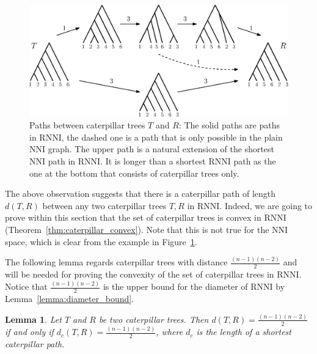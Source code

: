 \documentclass{amsart}
\newcommand{\nni}{\mathrm{NNI}}
\newcommand{\rnni}{\mathrm{RNNI}}
\newtheorem{lemma}[definition]{Lemma}
\begin{document}
\begin{figure}[H]
\centering
\includegraphics[width=\textwidth]{NNI_vs_RNNI}
\vspace{12pt}
\caption{Paths between caterpillar trees $T$ and $R$: The solid paths are paths in $\rnni$, the dashed one is a path that is only possible in the plain $\nni$ graph.
The upper path is a natural extension of the shortest $\nni$ path in $\rnni$.
It is longer than a shortest $\rnni$ path as the one at the bottom that consists of caterpillar trees only.}
\label{fig:NNI_vs_RNNI}
\end{figure}

The above observation suggests that there is a caterpillar path of length $d(T,R)$ between any two caterpillar trees $T,R$ in $\rnni$.
Indeed, we are going to prove within this section that the set of caterpillar trees is convex in $\rnni$ (Theorem~\ref{thm:caterpillar_convex}).
Note that this is not true for the $\nni$ space, which is clear from the example in Figure~\ref{fig:NNI_vs_RNNI}.

The following lemma regards caterpillar trees with distance $\frac{(n-1)(n-2)}{2}$ and will be needed for proving the convexity of the set of caterpillar trees in $\rnni$.
Notice that $\frac{(n-1)(n-2)}{2}$ is the upper bound for the diameter of $\rnni$ by Lemma~\ref{lemma:diameter_bound}.

\begin{lemma}
Let $T$ and $R$ be two caterpillar trees.
Then $d(T,R) = \frac{(n-1)(n-2)}{2}$ if and only if $d_c(T,R) = \frac{(n-1)(n-2)}{2}$, where $d_c$ is the length of a shortest caterpillar path.
\label{lemma:caterpillar_dist=diameter}
\end{lemma}
\end{document}
